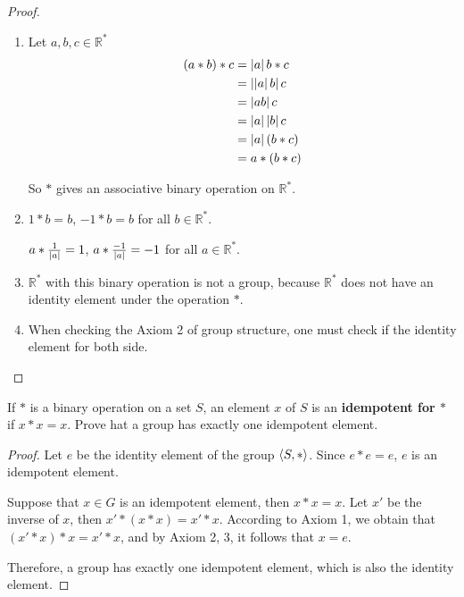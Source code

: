 \begin{proof}
    \begin{enumerate}[label={\textbf{\alph*.}}]
        \item Let $a, b, c\in\mathbb{R}^{*}$
              \begin{align*}
                  (a * b) * c & = \left\vert{a}\right\vert b * c    \\
                              & = \left\vert{\left\vert{a}\right\vert b}\right\vert c \\
                              & = \left\vert{ab}\right\vert c       \\
                              & = \left\vert{a}\right\vert\left\vert{b}\right\vert c \\
                              & = \left\vert{a}\right\vert(b * c)  \\
                              & = a * (b * c)
              \end{align*}

              So $*$ gives an associative binary operation on $\mathbb{R}^{*}$.
        \item $1 * b = b$, $-1 * b = b$ for all $b\in\mathbb{R}^{*}$.

              $a * \frac{1}{\left\vert{a}\right\vert} = 1$, $a * \frac{-1}{\left\vert{a}\right\vert} = -1$ for all $a\in\mathbb{R}^{*}$.
        \item $\mathbb{R}^{*}$ with this binary operation is not a group, because $\mathbb{R}^{*}$ does not have an identity element under the operation $*$.
        \item When checking the Axiom 2 of group structure, one must check if the identity element for both side.
    \end{enumerate}
\end{proof}

\begin{exercise}
    If $*$ is a binary operation on a set $S$, an element $x$ of $S$ is an \textbf{idempotent for $*$} if $x * x = x$. Prove hat a group has exactly one idempotent element.
\end{exercise}

\begin{proof}
    Let $e$ be the identity element of the group $\left\langle{S, *}\right\rangle$. Since $e * e = e$, $e$ is an idempotent element.

    Suppose that $x\in G$ is an idempotent element, then $x * x = x$. Let $x'$ be the inverse of $x$, then $x' * (x * x) = x' * x$. According to Axiom 1, we obtain that $(x' * x) * x = x' * x$, and by Axiom 2, 3, it follows that $x = e$.

    Therefore, a group has exactly one idempotent element, which is also the identity element.
\end{proof}


